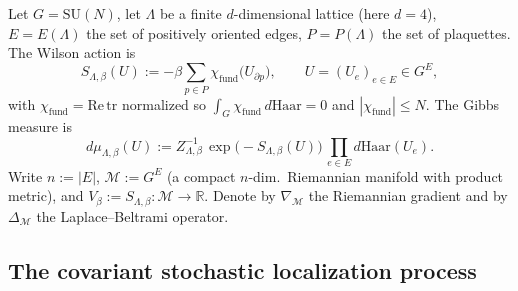Let $G=\mathrm{SU}(N)$, let $\Lambda$ be a finite $d$-dimensional
lattice (here $d=4$), $E=E(\Lambda)$ the set of positively oriented
edges, $P=P(\Lambda)$ the set of plaquettes. The Wilson action is
\[
  S_{\Lambda,\beta}(U)
  := -\beta\sum_{p\in P}\chi_{\mathrm{fund}}\!\bigl(U_{\partial p}\bigr),
  \qquad
  U=(U_{e})_{e\in E}\in G^{E},
\]
with $\chi_{\mathrm{fund}}=\mathrm{Re}\,\mathrm{tr}$ normalized so
$\int_{G}\chi_{\mathrm{fund}}\,d\mathrm{Haar}=0$ and
$|\chi_{\mathrm{fund}}|\le N$. The Gibbs measure is
\[
  d\mu_{\Lambda,\beta}(U)
  := Z_{\Lambda,\beta}^{-1}\,\exp\!\bigl(-S_{\Lambda,\beta}(U)\bigr)
  \,\prod_{e\in E}d\mathrm{Haar}(U_{e}).
\]
Write $n:=|E|$, $\mathcal{M}:=G^{E}$ (a compact $n$-dim.\ Riemannian
manifold with product metric), and $V_{\beta}:=S_{\Lambda,\beta}:\mathcal{M}\to\mathbb{R}$.
Denote by $\nabla_{\mathcal{M}}$ the Riemannian gradient and by
$\Delta_{\mathcal{M}}$ the Laplace--Beltrami operator.

\subsection{The covariant stochastic localization process}
\label{ssec:csl_process}


